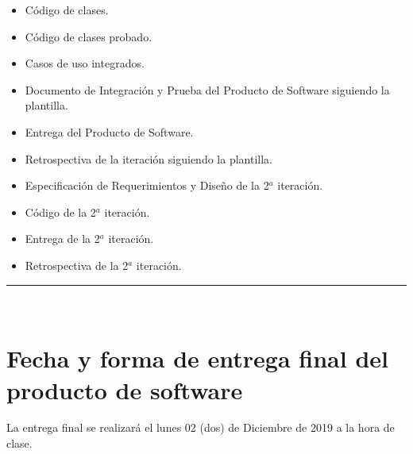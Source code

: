 \documentclass{article}
\begin{document}
\begin{itemize}
\item Código de clases.
\item Código de clases probado.
\item Casos de uso integrados.
\item Documento de Integración y Prueba del Producto de Software siguiendo la
  plantilla.
\item Entrega del Producto de Software.
\item Retrospectiva de la iteración siguiendo la plantilla.
\item Especificación de Requerimientos y Diseño de la 2$^{a}$ iteración.
\item Código de la 2$^{a}$ iteración.
\item Entrega de la 2$^{a}$ iteración.
\item Retrospectiva de la 2$^{a}$ iteración.
\end{itemize}
\rule{1\textwidth}{.8pt}\\

\section{Fecha y forma de entrega final del producto de software}
La entrega final se realizará el lunes 02 (dos) de Diciembre de 2019 a la hora de
clase.
\end{document}
